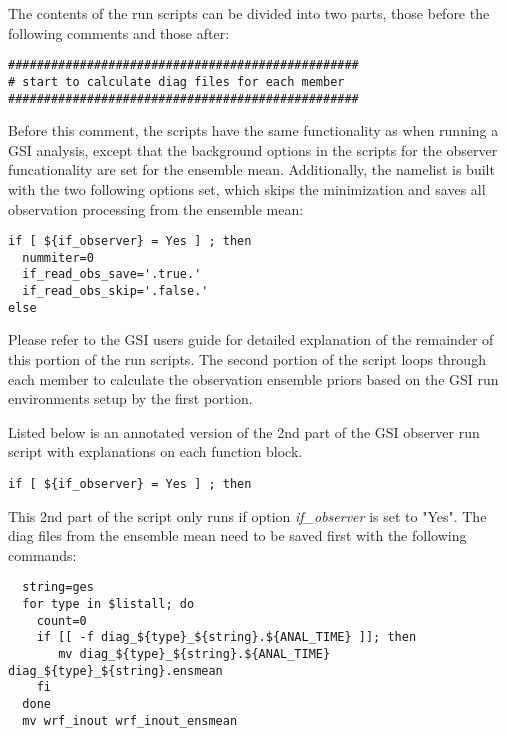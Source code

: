  The contents of the run scripts can be divided into two parts, those before the following comments and those after:
 \begin{scriptsize}
 \begin{verbatim}
#################################################
# start to calculate diag files for each member
#################################################
 \end{verbatim}
 \end{scriptsize}
 
Before this comment, the scripts have the same functionality as when running a GSI analysis, except that the background options in the scripts for the observer funcationality are set for the ensemble mean. Additionally, the namelist is built with the two following options set, which skips the minimization and saves all observation processing from the ensemble mean:
\begin{scriptsize}
\begin{verbatim}
if [ ${if_observer} = Yes ] ; then
  nummiter=0
  if_read_obs_save='.true.'
  if_read_obs_skip='.false.'
else
\end{verbatim}
\end{scriptsize}

Please refer to the GSI user\textquotesingle s guide for detailed explanation of the remainder of this portion of the run scripts. The second portion of the script loops through each member to calculate the observation ensemble priors based on the GSI run environments setup by the first portion.

Listed below is an annotated version of the 2nd part of the GSI observer run script with explanations on each function block.
\begin{scriptsize}
\begin{verbatim}
if [ ${if_observer} = Yes ] ; then
\end{verbatim}
\end{scriptsize}

This 2nd part of the script only runs if option \textit{if\_observer} is set to "Yes". The diag files from the ensemble mean need to be saved first with the following commands:
\begin{scriptsize}
\begin{verbatim}
  string=ges
  for type in $listall; do
    count=0
    if [[ -f diag_${type}_${string}.${ANAL_TIME} ]]; then
       mv diag_${type}_${string}.${ANAL_TIME} diag_${type}_${string}.ensmean
    fi
  done
  mv wrf_inout wrf_inout_ensmean
\end{verbatim}
\end{scriptsize}

